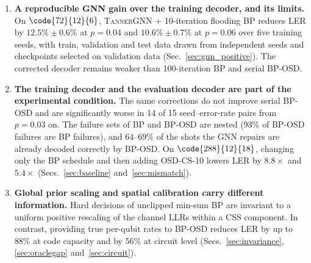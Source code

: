 \begin{enumerate}[leftmargin=*,topsep=3pt,itemsep=3pt]
\item \textbf{A reproducible GNN gain over the training decoder, and its
limits.} On $\code{72}{12}{6}$, \textsc{TannerGNN} + 10-iteration flooding
BP reduces LER by $12.5\%\pm0.6\%$ at $p=0.04$ and $10.6\%\pm0.7\%$ at
$p=0.06$ over five training seeds, with train, validation and test data
drawn from independent seeds and checkpoints selected on validation data
(Sec.~\ref{sec:gnn_positive}). The corrected decoder remains weaker than
100-iteration BP and serial BP-OSD.

\item \textbf{The training decoder and the evaluation decoder are part of
the experimental condition.} The same corrections do not improve serial
BP-OSD and are significantly worse in 14 of 15 seed--error-rate pairs
from $p=0.03$ on. The failure sets of BP
and BP-OSD are nested (93\% of BP-OSD failures are BP failures), and
64--69\% of the shots the GNN repairs are already decoded correctly by
BP-OSD. On $\code{288}{12}{18}$, changing only the BP schedule and then
adding OSD-CS-10 lowers LER by $8.8\times$ and $5.4\times$
(Secs.~\ref{sec:baseline} and~\ref{sec:mismatch}).

\item \textbf{Global prior scaling and spatial calibration carry
different information.} Hard decisions of unclipped min-sum BP are
invariant to a uniform positive rescaling of the channel LLRs within a
CSS component. In contrast, providing true per-qubit rates to BP-OSD
reduces LER by up to $88\%$ at code capacity and by $56\%$ at circuit
level (Secs.~\ref{sec:invariance}, \ref{sec:oraclegap}
and~\ref{sec:circuit}).
\end{enumerate}


